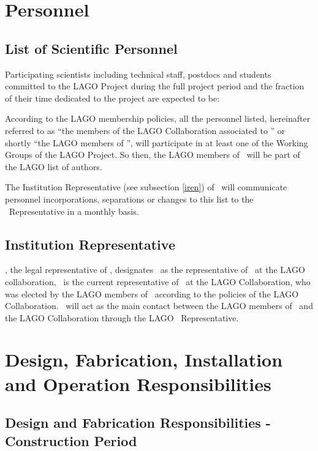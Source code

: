 \section{Personnel}

\subsection{List of Scientific Personnel}

Participating scientists including technical staff, postdocs and students
committed to the LAGO Project during the full project period and the fraction
of their time dedicated to the project are expected to be:



According to the LAGO membership policies, all the personnel listed,
hereinafter referred to as ``the members of the LAGO Collaboration associated
to \institution'' or shortly ``the LAGO members of \institution'', will
participate in at least one of the Working Groups of the LAGO Project. So then,
the LAGO members of \institution~will be part of the LAGO list of authors. 

The Institution Representative (see subsection \ref{iren}) of \institution~will
communicate personnel incorporations, separations or changes to this list to
the \country~Representative in a monthly basis.

\subsection{Institution Representative\label{iren}}

\ifil
\instlegalrep, the legal representative of \institution, designates \instrep~as the representative of \institution~at the LAGO collaboration,
\else
\instrep~is the current representative of \institution~at the LAGO
Collaboration, 
\fi
who was elected by the LAGO members of \institution~according to
the policies of the LAGO Collaboration. \instrep~will act as the main contact
between the LAGO members of \institution~and the LAGO Collaboration through the
LAGO \country~Representative. 

\section{Design, Fabrication, Installation and Operation Responsibilities}

\subsection{Design and Fabrication Responsibilities - Construction Period}

